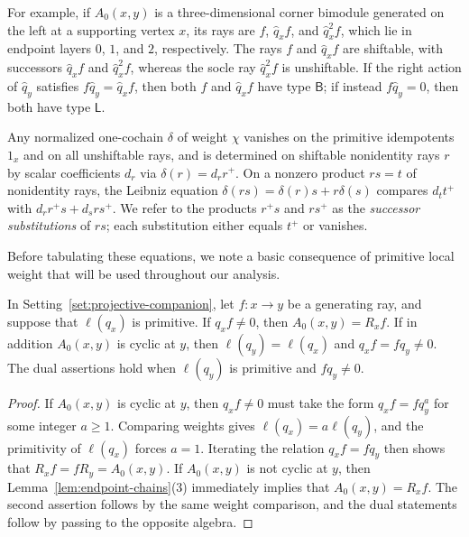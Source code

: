 For example, if $A_0(x,y)$ is a three-dimensional corner bimodule generated on the left at a supporting vertex $x$, its rays are $f$, $\widehat q_xf$, and $\widehat q_x^2f$, which lie in endpoint layers $0$, $1$, and $2$, respectively. The rays $f$ and $\widehat q_xf$ are shiftable, with successors $\widehat q_xf$ and $\widehat q_x^2f$, whereas the socle ray $\widehat q_x^2f$ is unshiftable. If the right action of $\widehat q_y$ satisfies $f\widehat q_y=\widehat q_xf$, then both $f$ and $\widehat q_xf$ have type $\mathsf B$; if instead $f\widehat q_y=0$, then both have type $\mathsf L$.

Any normalized one-cochain $\delta$ of weight $\chi$ vanishes on the primitive idempotents $1_x$ and on all unshiftable rays, and is determined on shiftable nonidentity rays $r$ by scalar coefficients $d_r$ via $\delta(r)=d_r r^+$. On a nonzero product $rs=t$ of nonidentity rays, the Leibniz equation $\delta(rs)=\delta(r)s+r\delta(s)$ compares $d_t t^+$ with $d_r r^+s+d_s rs^+$. We refer to the products $r^+s$ and $rs^+$ as the \emph{successor substitutions} of $rs$; each substitution either equals $t^+$ or vanishes.

Before tabulating these equations, we note a basic consequence of primitive local weight that will be used throughout our analysis.

\begin{lemma}
\label{lem:primitive-action-generation}
In Setting~\ref{set:projective-companion}, let $f\colon x\to y$ be a generating ray, and suppose that $\ell(q_x)$ is primitive. If $q_xf\ne0$, then $A_0(x,y)=R_xf$. If in addition $A_0(x,y)$ is cyclic at $y$, then $\ell(q_y)=\ell(q_x)$ and $q_xf=fq_y\ne0$. The dual assertions hold when $\ell(q_y)$ is primitive and $fq_y\ne0$.
\end{lemma}
\begin{proof}
If $A_0(x,y)$ is cyclic at $y$, then $q_xf\ne0$ must take the form $q_xf=fq_y^a$ for some integer $a\geq1$. Comparing weights gives $\ell(q_x)=a\ell(q_y)$, and the primitivity of $\ell(q_x)$ forces $a=1$. Iterating the relation $q_xf=fq_y$ then shows that $R_xf=fR_y=A_0(x,y)$. If $A_0(x,y)$ is not cyclic at $y$, then Lemma~\ref{lem:endpoint-chains}(3) immediately implies that $A_0(x,y)=R_xf$. The second assertion follows by the same weight comparison, and the dual statements follow by passing to the opposite algebra.
\end{proof}

